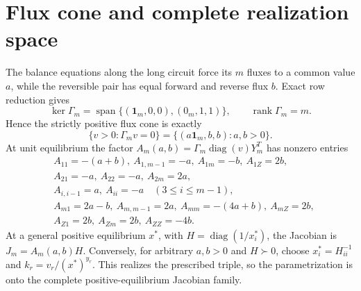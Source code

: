 \section*{Flux cone and complete realization space}
The balance equations along the long circuit force its $m$ fluxes to a common value $a$, while the reversible pair has equal forward and reverse flux $b$.  Exact row reduction gives
\[
\ker\Gamma_m=\operatorname{span}\{(\mathbf1_m,0,0),(0_m,1,1)\},
\qquad \operatorname{rank}\Gamma_m=m.
\]
Hence the strictly positive flux cone is exactly
\[
\{v>0:\Gamma_mv=0\}=\{(a\mathbf1_m,b,b):a,b>0\}.
\]
At unit equilibrium the factor $A_m(a,b)=\Gamma_m\operatorname{diag}(v)Y_m^T$ has nonzero entries
\begin{align*}
&A_{11}=-(a+b),\ A_{1,m-1}=-a,\ A_{1m}=-b,\ A_{1Z}=2b,\\
&A_{21}=-a,\ A_{22}=-a,\ A_{2m}=2a,\\
&A_{i,i-1}=a,\ A_{ii}=-a\quad(3\le i\le m-1),\\
&A_{m1}=2a-b,\ A_{m,m-1}=2a,\ A_{mm}=-(4a+b),\ A_{mZ}=2b,\\
&A_{Z1}=2b,\ A_{Zm}=2b,\ A_{ZZ}=-4b.
\end{align*}
At a general positive equilibrium $x^*$, with $H=\operatorname{diag}(1/x_i^*)$, the Jacobian is $J_m=A_m(a,b)H$.  Conversely, for arbitrary $a,b>0$ and $H\succ0$, choose $x_i^*=H_{ii}^{-1}$ and $k_r=v_r/(x^*)^{y_r}$.  This realizes the prescribed triple, so the parametrization is onto the complete positive-equilibrium Jacobian family.
